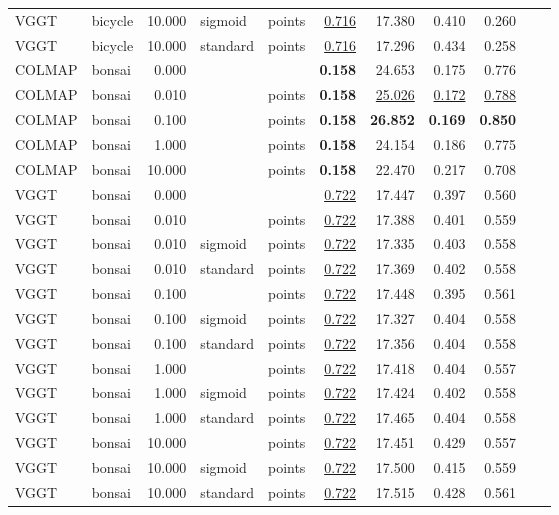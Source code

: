\begin{table}[H]
\begin{tabular}{llrllrrrrrr}
VGGT & bicycle & 10.000 & sigmoid & points & \underline{0.716} & 17.380 & 0.410 & 0.260 &  &  \\
VGGT & bicycle & 10.000 & standard & points & \underline{0.716} & 17.296 & 0.434 & 0.258 &  &  \\
\midrule
COLMAP & bonsai & 0.000 &  &  & \textbf{0.158} & 24.653 & 0.175 & 0.776 &  &  \\
COLMAP & bonsai & 0.010 &  & points & \textbf{0.158} & \underline{25.026} & \underline{0.172} & \underline{0.788} &  &  \\
COLMAP & bonsai & 0.100 &  & points & \textbf{0.158} & \textbf{26.852} & \textbf{0.169} & \textbf{0.850} &  &  \\
COLMAP & bonsai & 1.000 &  & points & \textbf{0.158} & 24.154 & 0.186 & 0.775 &  &  \\
COLMAP & bonsai & 10.000 &  & points & \textbf{0.158} & 22.470 & 0.217 & 0.708 &  &  \\
VGGT & bonsai & 0.000 &  &  & \underline{0.722} & 17.447 & 0.397 & 0.560 &  &  \\
VGGT & bonsai & 0.010 &  & points & \underline{0.722} & 17.388 & 0.401 & 0.559 &  &  \\
VGGT & bonsai & 0.010 & sigmoid & points & \underline{0.722} & 17.335 & 0.403 & 0.558 &  &  \\
VGGT & bonsai & 0.010 & standard & points & \underline{0.722} & 17.369 & 0.402 & 0.558 &  &  \\
VGGT & bonsai & 0.100 &  & points & \underline{0.722} & 17.448 & 0.395 & 0.561 &  &  \\
VGGT & bonsai & 0.100 & sigmoid & points & \underline{0.722} & 17.327 & 0.404 & 0.558 &  &  \\
VGGT & bonsai & 0.100 & standard & points & \underline{0.722} & 17.356 & 0.404 & 0.558 &  &  \\
VGGT & bonsai & 1.000 &  & points & \underline{0.722} & 17.418 & 0.404 & 0.557 &  &  \\
VGGT & bonsai & 1.000 & sigmoid & points & \underline{0.722} & 17.424 & 0.402 & 0.558 &  &  \\
VGGT & bonsai & 1.000 & standard & points & \underline{0.722} & 17.465 & 0.404 & 0.558 &  &  \\
VGGT & bonsai & 10.000 &  & points & \underline{0.722} & 17.451 & 0.429 & 0.557 &  &  \\
VGGT & bonsai & 10.000 & sigmoid & points & \underline{0.722} & 17.500 & 0.415 & 0.559 &  &  \\
VGGT & bonsai & 10.000 & standard & points & \underline{0.722} & 17.515 & 0.428 & 0.561 &  &  \\

\end{tabular}
\end{table}
